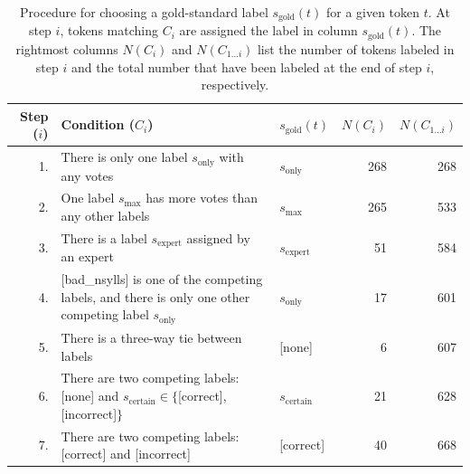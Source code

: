 		\begin{table}[htb]
		\caption[Procedure for choosing a gold-standard label for a given token]{Procedure for choosing a gold-standard label $s_{\text{gold}}(t)$ for a given token $t$. At step $i$, tokens matching $C_i$ are assigned the label in column $s_{\text{gold}}(t)$. The rightmost columns $N(C_i)$ and $N(C_{1 \dots i})$ list the number of tokens labeled in step $i$ and the total number that have been labeled at the end of step $i$, respectively.}
			\begin{tabularx}{\textwidth}{rXlrr}
			\toprule
			Step ($i$)
			& Condition ($C_i$) \TODO{reword w/ $S_t$\&$S_{\text{max}}$} & $s_{\text{gold}}(t)$ & $N(C_i)$ & $N(C_{1 \dots i})$ \\
			\midrule
			
			1.& There is only one label $s_{\text{only}}$ with any votes & 
			$s_{\text{only}}$ & 268 & 268 \\
			 
			2.& One label $s_{\text{max}}$ has more votes than any other labels & 
			$s_{\text{max}}$ & 265 & 533 \\
			
			3.& There is a label $s_{\text{expert}}$ assigned by an expert & 
			$s_{\text{expert}}$ & 51 & 584 \\
			
			4.& \mbox{[bad\_nsylls]} is one of the competing labels, 
			and there is only one other competing label $s_{\text{only}}$  \TODO{reword}
			& 
			$s_{\text{only}}$ & 17 & 601 \\
			
			5.& There is a three-way tie between labels
			&
			\mbox{[none]} & 6 & 607\\
			
			6.& There are two competing labels: 
			\mbox{[none]} and 
			$s_{\text{certain}} \in \{$[correct],[incorrect]$\}$ &
			$s_{\text{certain}}$ & 21 & 628\\
			
			7.& There are two competing labels: \mbox{[correct]} and \mbox{[incorrect]} &
			\mbox{[correct]} & 40 & 668\\
	
			\bottomrule
			\end{tabularx}
		\label{tab:agreement:goldrules}
		\end{table}
		
